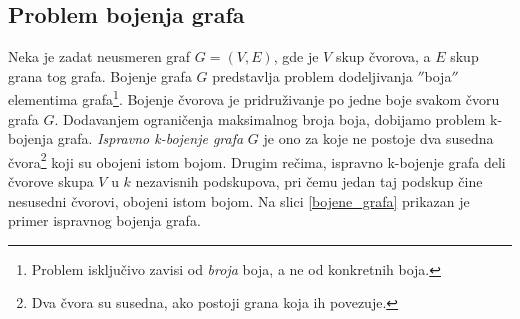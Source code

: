 \documentclass[a4paper]{article}
\begin{document}
\subsection{Problem bojenja grafa}
\label{sec:bojenje_grafa}
Neka je zadat neusmeren graf $G = (V, E)$, gde je $V$ skup čvorova, a $E$ skup grana tog grafa. 
Bojenje grafa $G$ predstavlja problem dodeljivanja $''$boja$''$ elementima grafa\footnote{Problem isključivo zavisi od \textit{broja} boja, a ne od konkretnih boja.}. 
Bojenje čvorova je pridruživanje po jedne boje svakom čvoru grafa $G$. 
Dodavanjem ograničenja maksimalnog broja boja, dobijamo problem k-bojenja grafa. \textit{Ispravno k-bojenje grafa} $G$ je ono za koje ne postoje dva susedna čvora\footnote{Dva čvora su susedna, ako postoji grana koja ih povezuje.} koji su obojeni istom bojom. 
Drugim rečima, ispravno k-bojenje grafa deli čvorove skupa $V$ u $k$ nezavisnih podskupova, pri čemu jedan taj podskup čine nesusedni čvorovi, obojeni istom bojom. Na slici \ref{bojene_grafa} prikazan je primer ispravnog bojenja grafa.
\end{document}

